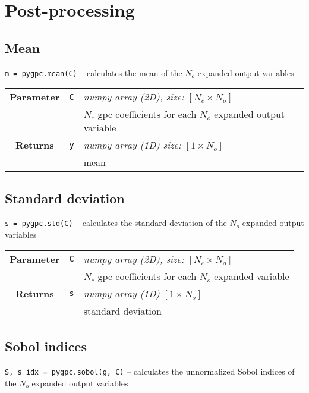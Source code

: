 \section{Post-processing}
\subsection{Mean}
\texttt{m = pygpc.mean(C)} -- calculates the mean of the $N_o$ expanded output variables 
\renewcommand{\arraystretch}{1.3}

\begin{tabular}{c c l}
	\hline
	\textbf{Parameter} & \texttt{C} & \textit{numpy array (2D), size:} $[N_c \times N_o]$ \\
	                   &            & $N_c$ gpc coefficients for each $N_o$ expanded output variable   \\ \hline
	 \textbf{Returns}  & \texttt{y} & \textit{numpy array (1D) size:} $[1 \times N_o]$ \\
					   &            & mean
\end{tabular} 

\subsection{Standard deviation}
\texttt{s = pygpc.std(C)} -- calculates the standard deviation of the $N_o$ expanded output variables 
\renewcommand{\arraystretch}{1.3}

\begin{tabular}{c c l}
	\hline
	\textbf{Parameter} & \texttt{C} & \textit{numpy array (2D), size:} $[N_c \times N_o]$     \\
	                   &            & $N_c$ gpc coefficients for each $N_o$ expanded variable \\ \hline
	 \textbf{Returns}  & \texttt{s} & \textit{numpy array (1D)} $[1 \times N_o]$              \\
	                   &            & standard deviation
\end{tabular} 

\subsection{Sobol indices}
\texttt{S, s\_idx = pygpc.sobol(g, C)} -- calculates the unnormalized Sobol indices of the $N_o$ expanded output variables 
\renewcommand{\arraystretch}{1.3}

